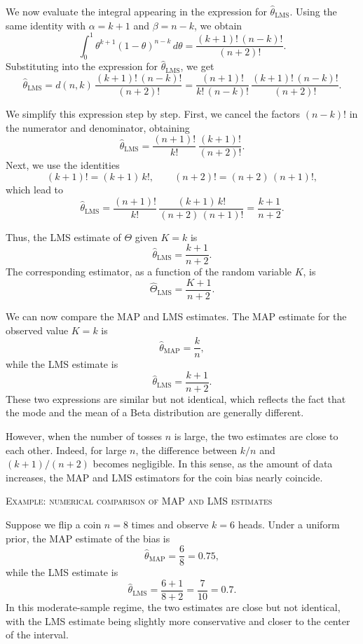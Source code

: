 We now evaluate the integral appearing in the expression for \(\hat{\theta}_{\text{LMS}}\).  
Using the same identity with \(\alpha = k+1\) and \(\beta = n-k\), we obtain
\[
\int_{0}^{1} \theta^{k+1}(1-\theta)^{n-k}\,d\theta
=
\frac{(k+1)!\,(n-k)!}{(n+2)!}.
\]
Substituting into the expression for \(\hat{\theta}_{\text{LMS}}\), we get
\[
\hat{\theta}_{\text{LMS}}
=
d(n,k)
\,
\frac{(k+1)!\,(n-k)!}{(n+2)!}
=
\frac{(n+1)!}{k!\,(n-k)!}
\,
\frac{(k+1)!\,(n-k)!}{(n+2)!}.
\]

We simplify this expression step by step.  
First, we cancel the factors \((n-k)!\) in the numerator and denominator, obtaining
\[
\hat{\theta}_{\text{LMS}}
=
\frac{(n+1)!}{k!}
\,
\frac{(k+1)!}{(n+2)!}.
\]
Next, we use the identities
\[
(k+1)! = (k+1)\,k!,
\qquad
(n+2)! = (n+2)\,(n+1)!,
\]
which lead to
\[
\hat{\theta}_{\text{LMS}}
=
\frac{(n+1)!}{k!}
\,
\frac{(k+1)\,k!}{(n+2)\,(n+1)!}
=
\frac{k+1}{n+2}.
\]

Thus, the LMS estimate of \(\Theta\) given \(K = k\) is
\[
\hat{\theta}_{\text{LMS}}
=
\frac{k+1}{n+2}.
\]
The corresponding estimator, as a function of the random variable \(K\), is
\[
\hat{\Theta}_{\text{LMS}}
=
\frac{K+1}{n+2}.
\]

We can now compare the MAP and LMS estimates.  
The MAP estimate for the observed value \(K = k\) is
\[
\hat{\theta}_{\text{MAP}} = \frac{k}{n},
\]
while the LMS estimate is
\[
\hat{\theta}_{\text{LMS}} = \frac{k+1}{n+2}.
\]
These two expressions are similar but not identical, which reflects the fact that the mode and the mean of a Beta distribution are generally different.  

However, when the number of tosses \(n\) is large, the two estimates are close to each other.  
Indeed, for large \(n\), the difference between \(k/n\) and \((k+1)/(n+2)\) becomes negligible.  
In this sense, as the amount of data increases, the MAP and LMS estimators for the coin bias nearly coincide.  

\bigskip
\textsc{Example: numerical comparison of MAP and LMS estimates}

Suppose we flip a coin \(n = 8\) times and observe \(k = 6\) heads.  
Under a uniform prior, the MAP estimate of the bias is
\[
\hat{\theta}_{\text{MAP}}
=
\frac{6}{8}
=
0.75,
\]
while the LMS estimate is
\[
\hat{\theta}_{\text{LMS}}
=
\frac{6+1}{8+2}
=
\frac{7}{10}
=
0.7.
\]
In this moderate-sample regime, the two estimates are close but not identical, with the LMS estimate being slightly more conservative and closer to the center of the interval.



